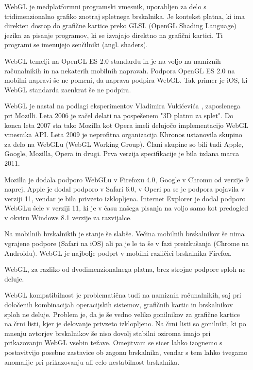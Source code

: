 WebGL \cite{webgl} je medplatformni programski vmesnik, uporabljen za delo s tridimenzionalno grafiko znotraj spletnega brskalnika. Je kontekst platna, ki ima direkten dostop do grafične kartice preko GLSL (OpenGL Shading Language) jezika za pisanje programov, ki se izvajajo direktno na grafični kartici. Ti programi se imenujejo senčilniki (angl. shaders). 

WebGL temelji na OpenGL ES 2.0 standardu in je na voljo na namiznih računalnikih in na nekaterih mobilnih napravah. Podpora OpenGL ES 2.0 na mobilni napravi še ne pomeni, da naprava podpira WebGL. Tak primer je iOS, ki WebGL standarda zaenkrat še ne podpira.

WebGL je nastal na podlagi eksperimentov Vladimira Vukićevića \cite{vlad1}, zaposlenega pri Mozilli. Leta 2006 je začel delati na pospešenem "3D platnu za splet". Do konca leta 2007 sta tako Mozilla kot Opera imeli delujočo implementacijo WebGL vmesnika API. Leta 2009 je neprofitna organizacija Khronos ustanovila skupino za delo na WebGLu (WebGL Working Group). Člani skupine so bili tudi Apple, Google, Mozilla, Opera in drugi. Prva verzija specifikacije je bila izdana marca 2011.

Mozilla je dodala podporo WebGLu v Firefoxu 4.0, Google v Chromu od verzije 9 naprej, Apple je dodal podporo v Safari 6.0, v Operi pa se je podpora pojavila v verziji 11, vendar je bila privzeto izklopljena. Internet Explorer je dodal podporo WebGLu šele v verziji 11, ki je v času našega pisanja na voljo samo kot predogled v okviru Windows 8.1 verzije za razvijalce.

Na mobilnih brskalnikih je stanje še slabše. Večina mobilnih brskalnikov še nima vgrajene podpore (Safari na iOS) ali pa je le ta še v fazi preizkušanja (Chrome na Androidu). WebGL je najbolje podprt v mobilni različici brskalnika Firefox.

WebGL, za razliko od dvodimenzionalnega platna, brez strojne podpore sploh ne deluje. 

WebGL kompatibilnost je problematična tudi na namiznih računalnikih, saj pri določenih kombinacijah operacijskih sistemov, grafičnih kartic in brskalnikov sploh ne deluje. Problem je, da je še vedno veliko gonilnikov za grafične kartice na črni listi, kjer je delovanje privzeto izklopljeno. Na črni listi so gonilniki, ki po mnenju avtorjev brskalnikov še niso dovolj stabilni oziroma imajo pri prikazovanju WebGL vsebin težave. Omejitvam se sicer lahko izognemo s postavitvijo posebne zastavice ob zagonu brskalnika, vendar s tem lahko tvegamo anomalije pri prikazovanju ali celo nestabilnost brskalnika.

